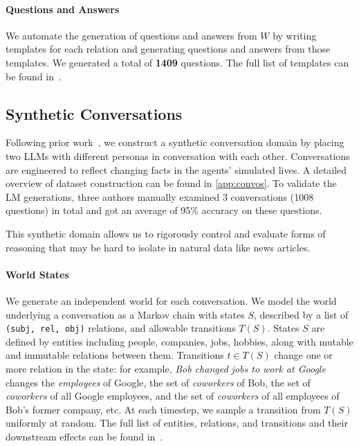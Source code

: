 \documentclass[11pt]{article}
\begin{document}
\paragraph{Questions and Answers}
We automate the generation of questions and answers from $W$ by writing templates for each relation and generating questions and answers from those templates. We generated a total of \textbf{1409} questions. The full list of templates can be found in~.






\subsection{Synthetic Conversations}
Following prior work~\cite{maharana2024lococmo}, we construct a synthetic conversation domain by placing two LLMs with different personas in conversation with each other. Conversations are engineered to reflect changing facts in the agents' simulated lives. A detailed overview of dataset construction can be found in \cref{app:convos}.  To validate the LM generations, three authors manually examined 3 conversations (1008 questions) in total and got an average of 95\% accuracy on these questions.

This synthetic domain allows us to rigorously control and evaluate forms of reasoning that may be hard to isolate in natural data like news articles. 

\paragraph{World States}
We generate an independent world for each conversation.
We model the world underlying a conversation as a Markov chain with states $S$, described by a list of \texttt{(subj, rel, obj)} relations, and allowable transitions $T(S)$. States $S$ are defined by entities including people, companies, jobs, hobbies, along with mutable and immutable relations between them.
Transitions $t\in T(S)$
change one or more relation in the state: for example, \textit{Bob changed jobs to work at Google} changes the \textit{employees} of Google, the set of \textit{coworkers} of Bob, the set of \textit{coworkers} of all Google employees, and the set of \textit{coworkers} of all employees of Bob's former company, etc. At each timestep, we sample a transition from $T(S)$ uniformly at random.
The full list of entities, relations, and transitions and their downstream effects can be found in~.
\end{document}
